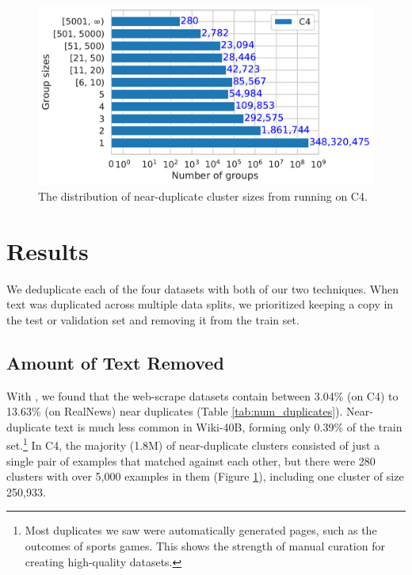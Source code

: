 \begin{figure}[t]
    \centering
    \includegraphics[width=0.6\linewidth]{figures/nd3/nd3-cluster-hist-c4.pdf}
    \caption{The distribution of near-duplicate cluster sizes from running \Approx{} on C4.}
    \label{fig:nd3-cluster-hist-c4}
\end{figure}

\section{Results}\label{sec:deduplication-results}
We deduplicate each of the four datasets with both of our two techniques.
When text was duplicated across multiple data splits, we prioritized keeping a copy in the test or validation set and removing it from the train set.
%





\subsection{Amount of Text Removed}
With \Approx{}, we found that the web-scrape datasets contain between 3.04\% (on C4) to 13.63\% (on RealNews) near duplicates (Table \ref{tab:num_duplicates}).
Near-duplicate text is much less common in Wiki-40B, forming only 0.39\% of the train set.\footnote{Most duplicates we saw were automatically generated pages, such as the outcomes of sports games.
This shows the strength of manual curation for creating high-quality datasets.}
In C4, the majority (1.8M) of near-duplicate clusters consisted of just a single pair of examples that matched against each other, but there were 280 clusters with over 5,000 examples in them (Figure \ref{fig:nd3-cluster-hist-c4}), including one cluster of size 250,933.

